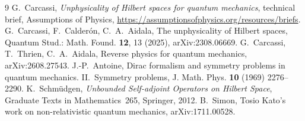 \documentclass[11pt]{article}
\theoremstyle{remark}
\begin{document}
\begin{thebibliography}{9}
 G.~Carcassi, \emph{Unphysicality of Hilbert spaces for quantum mechanics},
  technical brief, Assumptions of Physics,
  \url{https://assumptionsofphysics.org/resources/briefs}.
 G.~Carcassi, F.~Calder\'on, C.~A.~Aidala, The unphysicality of Hilbert spaces,
  Quantum Stud.: Math. Found. \textbf{12}, 13 (2025), arXiv:2308.06669.
 G.~Carcassi, T.~Thrien, C.~A.~Aidala, Reverse physics for quantum mechanics,
  arXiv:2608.27543.
 J.-P.~Antoine, Dirac formalism and symmetry problems in quantum mechanics.
  II.~Symmetry problems, J. Math. Phys. \textbf{10} (1969) 2276--2290.
 K.~Schmüdgen, \emph{Unbounded Self-adjoint Operators on Hilbert Space},
  Graduate Texts in Mathematics~265, Springer, 2012.
 B.~Simon, Tosio Kato's work on non-relativistic quantum mechanics,
  arXiv:1711.00528.
\end{thebibliography}
\end{document}
